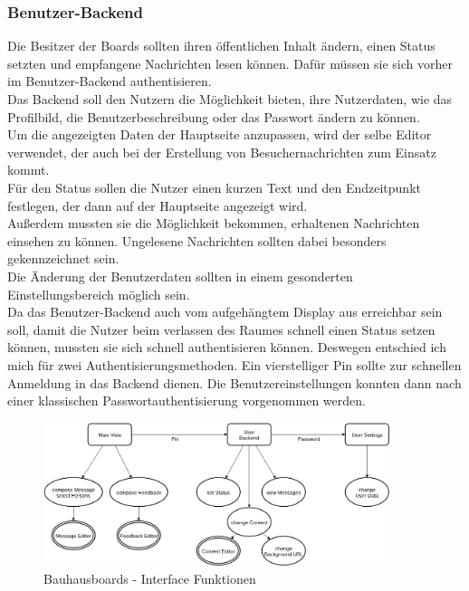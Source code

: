 \subsubsection{Benutzer-Backend}\label{Benutzer-Backend}
Die Besitzer der Boards sollten ihren öffentlichen Inhalt ändern, einen Status setzten und empfangene Nachrichten lesen können.
Dafür müssen sie sich vorher im Benutzer-Backend authentisieren.
\\
Das Backend soll den Nutzern die Möglichkeit bieten, ihre Nutzerdaten, wie das Profilbild, die Benutzerbeschreibung oder das Passwort ändern zu können.
\\
Um die angezeigten Daten der Hauptseite anzupassen, wird der selbe Editor verwendet, der auch bei der Erstellung von Besuchernachrichten zum Einsatz kommt.
\\
Für den Status sollen die Nutzer einen kurzen Text und den Endzeitpunkt festlegen, der dann auf der Hauptseite angezeigt wird.
\\
Außerdem mussten sie die Möglichkeit bekommen, erhaltenen Nachrichten einsehen zu können. Ungelesene Nachrichten sollten dabei besonders gekennzeichnet sein.\\
Die Änderung der Benutzerdaten sollten in einem gesonderten Einstellungsbereich möglich sein.
\\
Da das Benutzer-Backend auch vom aufgehängtem Display aus erreichbar sein soll, damit die Nutzer beim verlassen des Raumes schnell einen Status setzen können, mussten sie sich schnell authentisieren können. Deswegen entschied ich mich für zwei Authentisierungsmethoden. Ein vierstelliger Pin sollte zur schnellen Anmeldung in das Backend dienen. Die Benutzereinstellungen konnten dann nach einer klassischen Passwortauthentisierung vorgenommen werden.

\begin{figure}[h!]
  \centering
    \includegraphics[width=0.9\textwidth]{./img/LocationsFrontend.png}
  \caption{Bauhausboards - Interface Funktionen}
  \label{img:Interface}
\end{figure}


